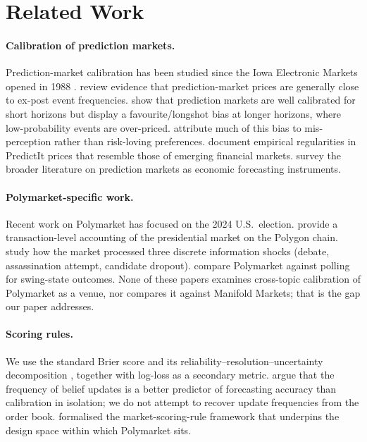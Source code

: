 \documentclass{article}
\begin{document}
\section{Related Work}

\paragraph{Calibration of prediction markets.}
Prediction-market calibration has been studied since the Iowa Electronic
Markets opened in 1988 \citep{berg2008results}. \citet{wolfers2004prediction}
review evidence that prediction-market prices are generally close to
ex-post event frequencies. \citet{page2013calibrated} show that
prediction markets are well calibrated for short horizons but display a
favourite/longshot bias at longer horizons, where low-probability events
are over-priced. \citet{snowberg2010explaining} attribute much of this
bias to mis-perception rather than risk-loving preferences.
\citet{restocchi2019stylized} document empirical regularities in
PredictIt prices that resemble those of emerging financial markets.
\citet{snowberg2013prediction} survey the broader literature on
prediction markets as economic forecasting instruments.

\paragraph{Polymarket-specific work.}
Recent work on Polymarket has focused on the 2024 U.S.\ election.
\citet{tsang2026anatomy} provide a transaction-level accounting of the
presidential market on the Polygon chain. \citet{tsang2026shocks} study
how the market processed three discrete information shocks (debate,
assassination attempt, candidate dropout). \citet{cutting2025betting}
compare Polymarket against polling for swing-state outcomes. None of
these papers examines cross-topic calibration of Polymarket as a venue,
nor compares it against Manifold Markets; that is the gap our paper
addresses.

\paragraph{Scoring rules.}
We use the standard Brier score \citep{brier1950verification} and its
reliability--resolution--uncertainty decomposition
\citep{murphy1973vector}, together with log-loss as a secondary metric.
\citet{atanasov2020small} argue that the frequency of belief updates is
a better predictor of forecasting accuracy than calibration in isolation;
we do not attempt to recover update frequencies from the order book.
\citet{hanson2003combinatorial} formalised the market-scoring-rule
framework that underpins the design space within which Polymarket sits.
\end{document}
